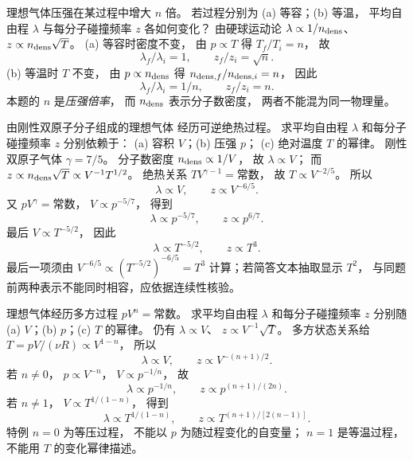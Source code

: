 理想气体压强在某过程中增大 $n$ 倍。
若过程分别为
(a) 等容；(b) 等温，
平均自由程 $\lambda$ 与每分子碰撞频率 $z$
各如何变化？
\exsolution
由硬球运动论
$\lambda\propto1/n_{\rm dens}$、
$z\propto n_{\rm dens}\sqrt T$。
(a) 等容时密度不变，
由 $p\propto T$ 得
$T_f/T_i=n$，
故
\[
\boxed{\lambda_f/\lambda_i=1,\qquad
z_f/z_i=\sqrt n}.
\]
(b) 等温时 $T$ 不变，
由 $p\propto n_{\rm dens}$ 得
$n_{{\rm dens},f}/n_{{\rm dens},i}=n$，
因此
\[
\boxed{\lambda_f/\lambda_i=1/n,\qquad
z_f/z_i=n}.
\]
\excheck 本题的 $n$ 是\emph{压强倍率}，
而 $n_{\rm dens}$ 表示分子数密度，
两者不能混为同一物理量。

由刚性双原子分子组成的理想气体
经历可逆绝热过程。
求平均自由程 $\lambda$
和每分子碰撞频率 $z$ 分别依赖于：
(a) 容积 $V$；(b) 压强 $p$；
(c) 绝对温度 $T$ 的幂律。
\exsolution
刚性双原子气体
$\gamma=7/5$。
分子数密度 $n_{\rm dens}\propto1/V$，
故 $\lambda\propto V$；
而
$z\propto n_{\rm dens}\sqrt T
\propto V^{-1}T^{1/2}$。
绝热关系
$TV^{\gamma-1}=\text{常数}$，
故 $T\propto V^{-2/5}$。
所以
\[
\boxed{\lambda\propto V,\qquad
z\propto V^{-6/5}}.
\]
又
$pV^\gamma=\text{常数}$，
$V\propto p^{-5/7}$，
得到
\[
\boxed{\lambda\propto p^{-5/7},\qquad
z\propto p^{6/7}}.
\]
最后
$V\propto T^{-5/2}$，
因此
\[
\boxed{\lambda\propto T^{-5/2},\qquad
z\propto T^{3}}.
\]
\excheck 最后一项须由
$V^{-6/5}\propto(T^{-5/2})^{-6/5}=T^3$
计算；若简答文本抽取显示 $T^2$，
与同题前两种表示不能同时相容，应依据连续性核验。

理想气体经历多方过程
$pV^n=\text{常数}$。
求平均自由程 $\lambda$
和每分子碰撞频率 $z$
分别随
(a) $V$；(b) $p$；(c) $T$
的幂律。
\exsolution
仍有
$\lambda\propto V$、
$z\propto V^{-1}\sqrt T$。
多方状态关系给
$T=pV/(\nu R)\propto V^{1-n}$，
所以
\[
\boxed{\lambda\propto V,\qquad
z\propto V^{-(n+1)/2}}.
\]
若 $n\ne0$，
$p\propto V^{-n}$，
$V\propto p^{-1/n}$，
故
\[
\boxed{\lambda\propto p^{-1/n},\qquad
z\propto p^{(n+1)/(2n)}}.
\]
若 $n\ne1$，
$V\propto T^{1/(1-n)}$，
得到
\[
\boxed{\lambda\propto T^{1/(1-n)},\qquad
z\propto T^{(n+1)/[2(n-1)]}}.
\]
\excheck 特例 $n=0$ 为等压过程，
不能以 $p$ 为随过程变化的自变量；
$n=1$ 是等温过程，
不能用 $T$ 的变化幂律描述。

